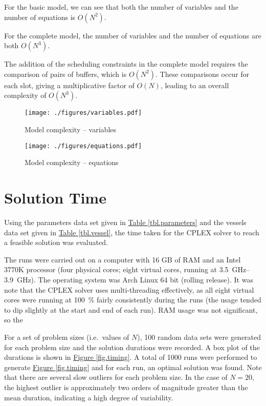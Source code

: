 For the basic model, we can see that both the number of variables and the
number of equations is $O \left( N^2 \right)$.

For the complete model, the number of variables and the number of equations
are both $O \left( N^3 \right)$.

The addition of the scheduling constraints in the complete model requires the
comparison of pairs of buffers, which is $O \left( N^2 \right)$. 
These comparisons occur for each slot, giving a multiplicative factor of 
$O \left( N \right)$, leading to an overall complexity of
$O \left( N^3 \right)$.

\begin{figure}
    \centering
    \texttt{[image: ./figures/variables.pdf]}
    \caption{Model complexity -- variables}
    \label{fig.dims}
\end{figure}
\begin{figure}
    \centering
    \texttt{[image: ./figures/equations.pdf]}
    \caption{Model complexity -- equations}
    \label{fig.eqns}
\end{figure}

\section{Solution Time}\label{S.soltime}
Using the parameters data set given in 
\hyperref[tbl.parameters]{Table \ref*{tbl.parameters}} and the vessels data set
given in \hyperref[tbl.vessel]{Table \ref*{tbl.vessel}}, the time taken for
the CPLEX solver to reach a feasible solution was evaluated.

The runs were carried out on a computer with 16 GB of RAM and an Intel 3770K
processor (four physical cores; eight virtual cores, running at
 \SIrange{3.5}{3.9}{\GHz}).
The operating system was Arch Linux 64 bit (rolling release).
It was note that the CPLEX solver uses multi-threading effectively, as all eight
virtual cores were running at \SI{100}{\%} fairly consistently during the runs
(the usage tended to dip slightly at the start and end of each run).
RAM usage was not significant, so the 

For a set of problem sizes (i.e.\ values of $N$), 100 random data sets
were generated for each problem size and the solution durations were recorded.
A box plot of the durations is shown in 
\hyperref[fig.timing]{Figure \ref*{fig.timing}}.
A total of \num{1000} runs were performed to generate
\hyperref[fig.timing]{Figure \ref*{fig.timing}} and for each run, an optimal
solution was found.
Note that there are several slow outliers for each problem size.
In the case of $N=20$, the highest outlier is approximately two
orders of magnitude greater than the mean duration, indicating a high degree
of variability.

